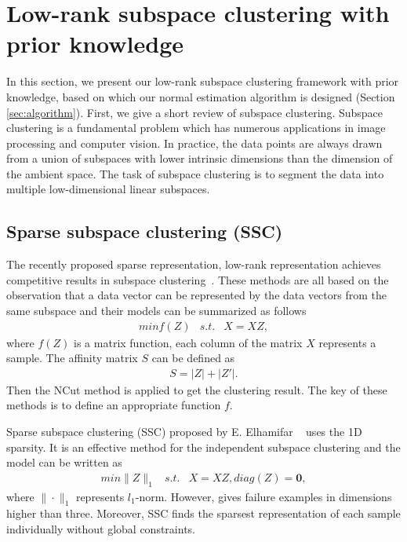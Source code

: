 \section{Low-rank subspace clustering with prior knowledge}
\label{sec:lowrank}
In this section, we present our low-rank subspace clustering framework with prior knowledge, based on which our normal estimation algorithm is designed (Section \ref{sec:algorithm}). First, we give a short review of subspace clustering. Subspace clustering is a fundamental problem which has numerous
applications in image processing and computer vision.
%
In practice, the data points are always drawn from a union of subspaces with lower intrinsic dimensions than the dimension of the ambient space.
The task of subspace clustering is to segment the data into multiple
low-dimensional linear subspaces.

\subsection{Sparse subspace clustering (SSC)}
\label{sec:subspacesegmentation}
The recently proposed sparse representation, low-rank representation achieves competitive results in subspace clustering~\cite{DBLP:journals/corr/abs-1010-2955,LiuLY10,DBLP:conf/cvpr/ElhamifarV09}. These methods are all based on the observation that a data vector can be represented by
the data vectors from the same subspace and their models can be summarized as follows
\begin{eqnarray}
min f(Z) & s.t. & X=XZ,
\end{eqnarray}
where $f(Z)$ is a matrix function, each column of the matrix $X$
represents a sample. The affinity matrix $S$ can be defined as
\begin{eqnarray}
S=|Z|+|Z'|. \label{eq:defineS}
\end{eqnarray}
Then the NCut method \cite{DBLP:journals/pami/ShiM00} is applied to get the
clustering result. The key of these methods is to
define an appropriate function $f$.


Sparse subspace clustering (SSC) proposed by E. Elhamifar \etal
~\cite{DBLP:conf/cvpr/ElhamifarV09} uses the 1D sparsity. It is an
effective method for the independent subspace clustering and the
model can be written as
\begin{eqnarray}
min \|Z\|_{1} & s.t. & X=XZ,diag(Z)=\textbf{0},
\end{eqnarray}
where $\|\cdot\|_{1}$ represents $l_{1}$-norm. However,
\cite{DBLP:conf/cvpr/NasihatkonH11} gives failure examples in dimensions higher than three. Moreover, SSC finds the sparsest
representation of each sample individually without global
constraints.
